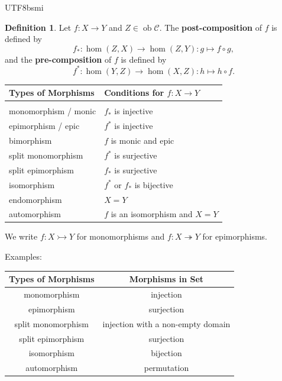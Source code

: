 \documentclass[12pt]{article}
\theoremstyle{definition}
\newtheorem{definition}{Definition}[section]
\newcommand\<{\langle}
\renewcommand\>{\rangle}
\DeclareMathOperator{\ob}{ob}
\begin{document}
\begin{CJK}{UTF8}{bsmi}
\begin{definition}
    Let $f:X\to Y$ and $Z\in\ob\mathcal{C}$.
    The \textbf{post-composition} of $f$ is defined by $$f_*:\hom(Z, X)\to\hom(Z, Y):g\mapsto f\circ g,$$ and the \textbf{pre-composition} of $f$ is defined by $$f^*:\hom(Y, Z)\to\hom(X, Z):h\mapsto h\circ f.$$
    \begin{center}
    \end{center}
\end{definition}
\begin{center}
\begin{tabular}{l|l}
    Types of Morphisms & Conditions for $f:X\to Y$ \\
    \hline \\[-12pt]
    monomorphism / monic & $f_*$ is injective \\
    epimorphism  / epic  & $f^*$ is injective \\
    bimorphism   & $f$ is monic and epic \\
    split monomorphism   & $f^*$ is surjective \\
    split epimorphism    & $f_*$ is surjective \\
    isomorphism  & $f^*$ or $f_*$ is bijective \\
    endomorphism & $X=Y$ \\
    automorphism & $f$ is an isomorphism and $X=Y$
\end{tabular}
\end{center}

We write $f:X\rightarrowtail Y$ for monomorphisms and $f:X\twoheadrightarrow Y$ for epimorphisms.

Examples:
\begin{center}
    \begin{tabular}{c|c}
        Types of Morphisms & Morphisms in \textbf{Set} \\
        \hline
        monomorphism & injection \\
        epimorphism  & surjection \\
        split monomorphism & injection with a non-empty domain \\
        split epimorphism & surjection \\
        isomorphism   & bijection \\
        automorphism  & permutation
    \end{tabular}
\end{center}


\end{CJK}
\end{document}
